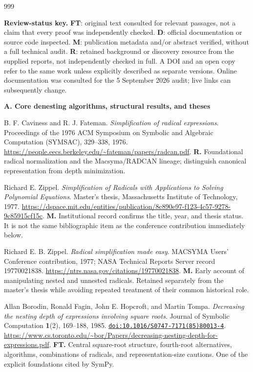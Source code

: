 \documentclass[11pt,a4paper]{article}
\newcommand{\doi}[1]{\href{https://doi.org/#1}{\nolinkurl{doi:#1}}}
\let\sourceurl\url
\theoremstyle{definition}
\theoremstyle{remark}
\numberwithin{equation}{section}
\begin{document}
\clearpage
{}
{}
\renewcommand{\refname}{Annotated bibliography}
\begin{thebibliography}{999}
\small
\setlength{\itemsep}{0.45em}
\item[]\textbf{Review-status key.} \textbf{FT}: original text consulted for relevant passages, not a claim that every proof was independently checked. \textbf{D}: official documentation or source code inspected. \textbf{M}: publication metadata and/or abstract verified, without a full technical audit. \textbf{R}: retained background or discovery resource from the supplied reports, not independently checked in full. A DOI and an open copy refer to the same work unless explicitly described as separate versions. Online documentation was consulted for the 5 September 2026 audit; live links can subsequently change.

\item[]\textbf{A. Core denesting algorithms, structural results, and theses}

B. F. Caviness and R. J. Fateman.
\emph{Simplification of radical expressions}.
Proceedings of the 1976 ACM Symposium on Symbolic and Algebraic Computation (SYMSAC), 329--338, 1976.
\sourceurl{https://people.eecs.berkeley.edu/~fateman/papers/radcan.pdf}.
\textbf{R.} Foundational radical normalization and the Macsyma/RADCAN lineage; distinguish canonical representation from depth minimization.

Richard E. Zippel.
\emph{Simplification of Radicals with Applications to Solving Polynomial Equations}.
Master's thesis, Massachusetts Institute of Technology, 1977.
\sourceurl{https://dspace.mit.edu/entities/publication/8c890e97-f123-4c57-9278-9c85915cf15c}.
\textbf{M.} Institutional record confirms the title, year, and thesis status. It is not the same bibliographic item as the conference contribution immediately below.

Richard E. B. Zippel.
\emph{Radical simplification made easy}.
MACSYMA Users' Conference contribution, 1977; NASA Technical Reports Server record 19770021838.
\sourceurl{https://ntrs.nasa.gov/citations/19770021838}.
\textbf{M.} Early account of manipulating nested and unnested radicals. Retained separately from the master's thesis while avoiding repeated treatment of their common historical role.

Allan Borodin, Ronald Fagin, John E. Hopcroft, and Martin Tompa.
\emph{Decreasing the nesting depth of expressions involving square roots}.
Journal of Symbolic Computation \textbf{1}(2), 169--188, 1985.
\doi{10.1016/S0747-7171(85)80013-4}.
\sourceurl{https://www.cs.toronto.edu/~bor/Papers/decreasing-nesting-depth-for-expressions.pdf}.
\textbf{FT.} Central square-root structure, fourth-root alternatives, algorithms, combinations of radicals, and representation-size cautions. One of the explicit foundations cited by SymPy.


\end{thebibliography}
\end{document}
